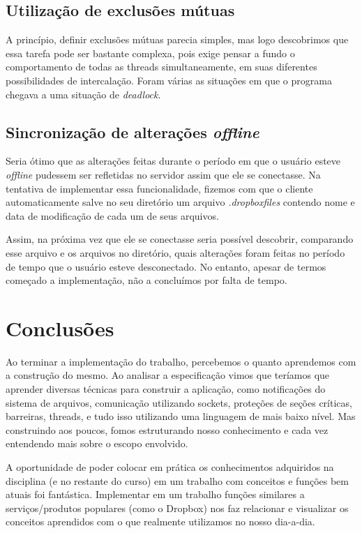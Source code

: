 \documentclass[a4paper]{article}
\begin{document}
\subsection{Utilização de exclusões mútuas}
A princípio, definir exclusões mútuas parecia simples, mas logo descobrimos que essa tarefa pode ser bastante complexa, pois exige pensar a fundo o comportamento de todas as threads simultaneamente, em suas diferentes possibilidades de intercalação. Foram várias as situações em que o programa chegava a uma situação de \textit{deadlock}.
 
\subsection{Sincronização de alterações \textit{offline}}
Seria ótimo que as alterações feitas durante o período em que o usuário esteve \textit{offline} pudessem ser refletidas no servidor assim que ele se conectasse. Na tentativa de implementar essa funcionalidade, fizemos com que o cliente automaticamente salve no seu diretório um arquivo \textit{.dropboxfiles} contendo nome e data de modificação de cada um de seus arquivos. 

Assim, na próxima vez que ele se conectasse seria possível descobrir, comparando esse arquivo e os arquivos no diretório, quais alterações foram feitas no período de tempo que o usuário esteve desconectado. 
No entanto, apesar de termos começado a implementação, não a concluímos por falta de tempo.

\section{Conclusões}
Ao terminar a implementação do trabalho, percebemos o quanto aprendemos com a construção do mesmo. Ao analisar a especificação vimos que teríamos que aprender diversas técnicas para construir a aplicação, como notificações do sistema de arquivos, comunicação utilizando sockets, proteções de seções críticas, barreiras, threads, e tudo isso utilizando uma linguagem de mais baixo nível. Mas construindo aos poucos, fomos estruturando nosso conhecimento e cada vez entendendo mais sobre o escopo envolvido.

A oportunidade de poder colocar em prática os conhecimentos adquiridos na disciplina (e no restante do curso) em um trabalho com conceitos e funções bem atuais foi fantástica. Implementar em um trabalho funções similares a serviços/produtos populares (como o Dropbox) nos faz relacionar e visualizar os conceitos aprendidos com o que realmente utilizamos no nosso dia-a-dia.
\end{document}
